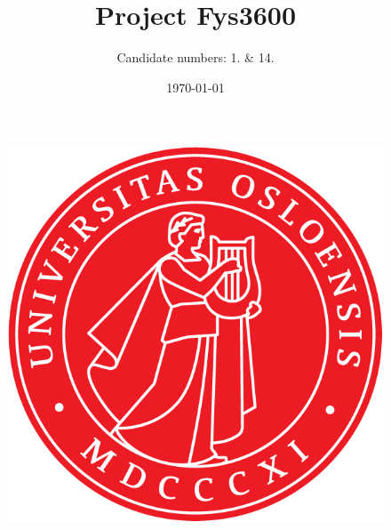 \documentclass[norsk,a4paper,12pt]{article}
\title{Project Fys3600}
\author{Candidate numbers: 1. \& 14.}
\date{\today}
\begin{document}
\maketitle

\begin{figure}[H]
	\begin{center}
		\includegraphics[scale=1.0]{Figures/uiosegl.png}
	\end{center}
\end{figure}



\newpage

\tableofcontents
\end{document}
